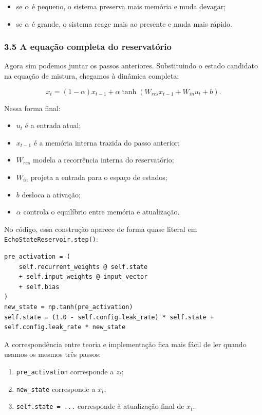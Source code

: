 \documentclass[12pt]{article}
\providecommand{\tightlist}{%
          \setlength{\itemsep}{0pt}\setlength{\parskip}{0pt}}
\begin{document}
\begin{itemize}
\tightlist
\item
  se \(\alpha\) é pequeno, o sistema preserva mais memória e muda devagar;
\item
  se \(\alpha\) é grande, o sistema reage mais ao presente e muda mais rápido.
\end{itemize}

\subsubsection{3.5 A equação completa do reservatório}\label{35-a-equauxe7uxe3o-completa-do-reservatuxf3rio}

Agora sim podemos juntar os passos anteriores. Substituindo o estado candidato na equação de mistura, chegamos à dinâmica completa:

\[
x_t = (1 - \alpha) x_{t-1} + \alpha \tanh(W_{res} x_{t-1} + W_{in} u_t + b).
\]

Nessa forma final:

\begin{itemize}
\tightlist
\item
  \(u_t\) é a entrada atual;
\item
  \(x_{t-1}\) é a memória interna trazida do passo anterior;
\item
  \(W_{res}\) modela a recorrência interna do reservatório;
\item
  \(W_{in}\) projeta a entrada para o espaço de estados;
\item
  \(b\) desloca a ativação;
\item
  \(\alpha\) controla o equilíbrio entre memória e atualização.
\end{itemize}

No código, essa construção aparece de forma quase literal em \texttt{EchoStateReservoir.step()}:

\begin{verbatim}
pre_activation = (
    self.recurrent_weights @ self.state
    + self.input_weights @ input_vector
    + self.bias
)
new_state = np.tanh(pre_activation)
self.state = (1.0 - self.config.leak_rate) * self.state + self.config.leak_rate * new_state
\end{verbatim}

A correspondência entre teoria e implementação fica mais fácil de ler quando usamos os mesmos três passos:

\begin{enumerate}
\def\labelenumi{\arabic{enumi}.}
\tightlist
\item
  \texttt{pre\_activation} corresponde a \(z_t\);
\item
  \texttt{new\_state} corresponde a \(\widetilde{x}_t\);
\item
  \texttt{self.state\ =\ ...} corresponde à atualização final de \(x_t\).
\end{enumerate}
\end{document}
